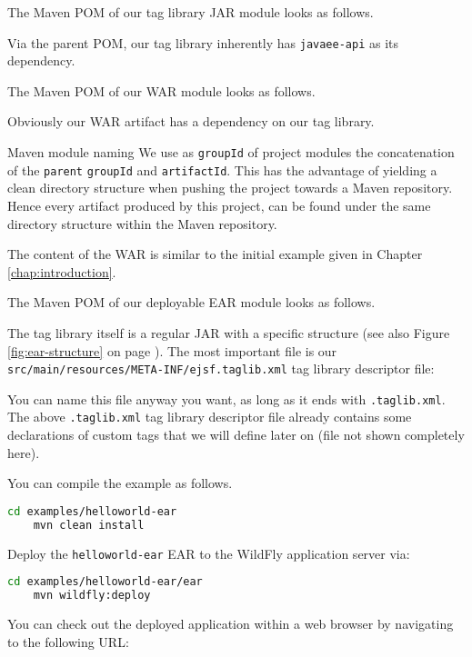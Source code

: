 The Maven POM of our tag library JAR module looks as follows.

Via the parent POM, our tag library inherently has \texttt{javaee-api} as its dependency.

The Maven POM of our WAR module looks as follows.

Obviously our WAR artifact has a dependency on our tag library.
\begin{TIP}{Maven module naming}
	We use as \texttt{groupId} of project modules the concatenation	of the \texttt{parent} \texttt{groupId} and \texttt{artifactId}.
	This has the advantage of yielding a clean directory structure when pushing the project towards a Maven repository.
	Hence every artifact produced by this project, can be found under the same directory structure within the Maven repository.
\end{TIP}

The content of the WAR is similar to the initial example given in Chapter \ref{chap:introduction}.

The Maven POM of our deployable EAR module looks as follows.


The tag library itself is a regular JAR with a specific structure (see also Figure \ref{fig:ear-structure} on page \pageref{fig:ear-structure}).
The most important file is our\\
\texttt{src/main/resources/META-INF/ejsf.taglib.xml} tag library descriptor file:

You can name this file anyway you want, as long as it ends with \texttt{.taglib.xml}.
The above \texttt{.taglib.xml} tag library descriptor file already contains some declarations of custom tags that we will define later on (file not shown completely here).

You can compile the example as follows.
\begin{lstlisting}[language=bash]
	cd examples/helloworld-ear
	mvn clean install
\end{lstlisting}

Deploy the \texttt{helloworld-ear} EAR to the WildFly application server via:
\begin{lstlisting}[language=bash]
	cd examples/helloworld-ear/ear
	mvn wildfly:deploy
\end{lstlisting}

You can check out the deployed application within a web browser by navigating to the following URL:

